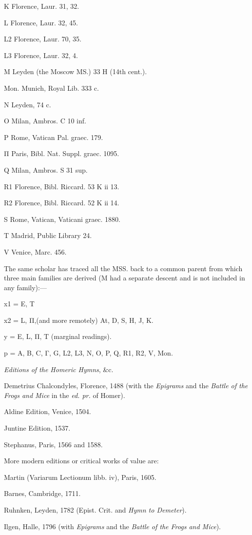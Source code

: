 K Florence, Laur. 31, 32.

L Florence, Laur. 32, 45.

L2 Florence, Laur. 70, 35.

L3 Florence, Laur. 32, 4.

M Leyden (the Moscow MS.) 33 H (14th cent.).

Mon. Munich, Royal Lib. 333 c.

N Leyden, 74 c.

O Milan, Ambros. C 10 inf.

P Rome, Vatican Pal. graec. 179.

Π Paris, Bibl. Nat. Suppl. graec. 1095.

Q Milan, Ambros. S 31 sup.

R1 Florence, Bibl. Riccard. 53 K ii 13.

R2 Florence, Bibl. Riccard. 52 K ii 14.

S Rome, Vatican, Vaticani graec. 1880.

T Madrid, Public Library 24.

V Venice, Marc. 456.

The same scholar has traced all the MSS. back to a common parent from which
three main families are derived (M had a separate descent and is not included
in any family):—

x1 = E, T

x2 = L, Π,(and more remotely) At, D, S, H, J, K.

y = E, L, Π, T (marginal readings).

p = A, B, C, Γ, G, L2, L3, N, O, P, Q,
R1, R2, V, Mon.

\emph{Editions of the Homeric Hymns}, \&c.

Demetrius Chalcondyles, Florence, 1488 (with the \emph{Epigrams} and the
\emph{Battle of the Frogs and Mice} in the \emph{ed. pr.} of Homer).

Aldine Edition, Venice, 1504.

Juntine Edition, 1537.

Stephanus, Paris, 1566 and 1588.

More modern editions or critical works of value are:

Martin (Variarum Lectionum libb. iv), Paris, 1605.

Barnes, Cambridge, 1711.

Ruhnken, Leyden, 1782 (Epist. Crit. and \emph{Hymn to Demeter}).

Ilgen, Halle, 1796 (with \emph{Epigrams} and the \emph{Battle of the Frogs and
Mice}).

